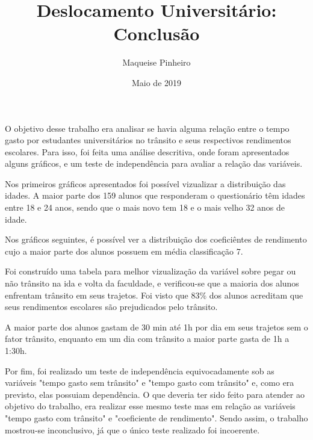 \documentclass[12pt,a4paper]{article}
\author{Maqueise Pinheiro}
\title{Deslocamento Universitário: Conclusão}
\date{Maio de 2019}
\begin{document}
\maketitle
O objetivo desse trabalho era analisar se havia alguma relação entre o tempo gasto por estudantes universitários no trânsito e seus respectivos rendimentos escolares. Para isso, foi feita uma análise descritiva, onde foram apresentados alguns gráficos, e um teste de independência para avaliar a relação das variáveis.

Nos primeiros gráficos apresentados foi possível vizualizar a distribuição das idades. A maior parte dos 159 alunos que responderam o questionário têm idades entre 18 e 24 anos, sendo que o mais novo tem 18 e o mais velho 32 anos de idade.

Nos gráficos seguintes, é possível ver a distribuição dos coeficiêntes de rendimento cujo a maior parte dos alunos possuem em média classificação 7.

Foi construído uma tabela para melhor vizualização da variável sobre pegar ou não trânsito na ida e volta da faculdade, e verificou-se que a maioria dos alunos enfrentam trânsito em seus trajetos. Foi visto que 83\% dos alunos acreditam que seus rendimentos escolares  são prejudicados pelo trânsito. 

A maior parte dos alunos gastam de 30 min até 1h por dia em seus trajetos sem o fator trânsito, enquanto em um dia com trânsito a maior parte gasta de 1h a 1:30h.

Por fim, foi realizado um teste de independência equivocadamente sob as variáveis "tempo gasto sem trânsito" e "tempo gasto com trânsito" e, como era previsto, elas possuiam dependência. O que deveria ter sido feito para atender ao objetivo do trabalho, era realizar esse mesmo teste mas em relação as variáveis "tempo gasto com trânsito" e "coeficiente de rendimento". Sendo assim, o trabalho mostrou-se inconclusivo, já que o único teste realizado foi incoerente.
\end{document}
